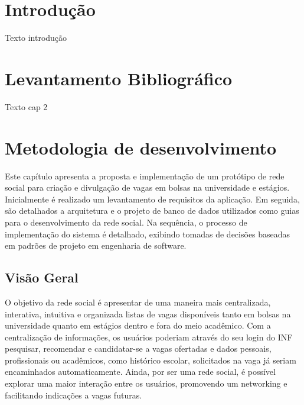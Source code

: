 \documentclass[cic,tc]{iiufrgs}
\begin{document}

\tableofcontents

\chapter{Introdução}

Texto introdução

\chapter{Levantamento Bibliográfico}

Texto cap 2

\chapter{Metodologia de desenvolvimento}
\label{metodologiaDesenvolvimento}
Este capítulo apresenta a proposta e implementação de um protótipo de rede social para criação e divulgação de vagas em bolsas na universidade e estágios. Inicialmente é realizado um levantamento de requisitos da aplicação. Em seguida, são detalhados a arquitetura e o projeto de banco de dados utilizados como guias para o desenvolvimento da rede social. Na sequência, o processo de implementação do sistema é detalhado, exibindo tomadas de decisões baseadas em padrões de projeto em engenharia de software.

\section{Visão Geral}
O objetivo da rede social é apresentar de uma maneira mais centralizada, interativa, intuitiva e organizada listas de vagas disponíveis tanto em bolsas na universidade quanto em estágios dentro e fora do meio acadêmico. Com a centralização de informações, os usuários poderiam através do seu login do INF pesquisar, recomendar e candidatar-se a vagas ofertadas e dados pessoais, profissionais ou acadêmicos, como histórico escolar, solicitados na vaga já seriam encaminhados automaticamente. Ainda, por ser uma rede social, é possível explorar uma maior interação entre os usuários, promovendo um networking e facilitando indicações a vagas futuras.
\end{document}
